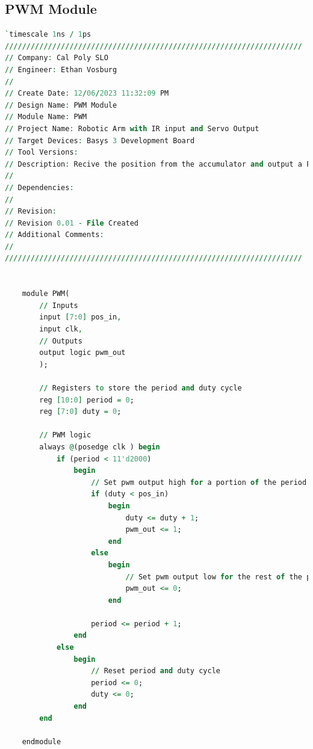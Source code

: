 \documentclass[
    a4paper, %
	12pt, %
    ]{CSSullivanBusinessReport}
\begin{document}
\subsection{PWM Module}

\begin{lstlisting}[language=VHDL]
`timescale 1ns / 1ps
/////////////////////////////////////////////////////////////////////
// Company: Cal Poly SLO
// Engineer: Ethan Vosburg
// 
// Create Date: 12/06/2023 11:32:09 PM
// Design Name: PWM Module
// Module Name: PWM
// Project Name: Robotic Arm with IR input and Servo Output 
// Target Devices: Basys 3 Development Board
// Tool Versions: 
// Description: Recive the position from the accumulator and output a PWM signal
// 
// Dependencies: 
// 
// Revision:
// Revision 0.01 - File Created
// Additional Comments:
// 
/////////////////////////////////////////////////////////////////////

    
    module PWM(
        // Inputs
        input [7:0] pos_in,
        input clk,
        // Outputs
        output logic pwm_out
        );
    
        // Registers to store the period and duty cycle
        reg [10:0] period = 0;
        reg [7:0] duty = 0;
    
        // PWM logic
        always @(posedge clk ) begin
            if (period < 11'd2000)
                begin
                    // Set pwm output high for a portion of the period
                    if (duty < pos_in)
                        begin 
                            duty <= duty + 1;
                            pwm_out <= 1;
                        end
                    else
                        begin
                            // Set pwm output low for the rest of the period
                            pwm_out <= 0;
                        end
    
                    period <= period + 1;
                end
            else
                begin
                    // Reset period and duty cycle
                    period <= 0;
                    duty <= 0;
                end
        end
    
    endmodule

\end{lstlisting}




\end{document}
